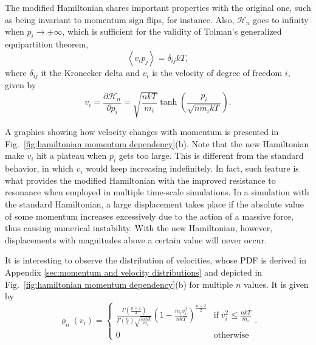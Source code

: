 \documentclass[
aip,
jcp,
reprint,
]{revtex4-1}
\newcommand{\diff}[2]{\frac{\partial #2}{\partial #1}} %
\begin{document}
The modified Hamiltonian shares important properties with the original one, such as being invariant to momentum sign flips, for instance.
Also, $\mathcal{H}_n$ goes to infinity when $p_i \to \pm \infty$, which is sufficient \cite{Uline_2008} for the validity of Tolman's generalized equipartition theorem,
\begin{equation}
\label{eq:generalized equipartition}
\left\langle v_i p_j \right\rangle = \delta_{ij} k T,
\end{equation}
where $\delta_{ij}$ it the Kronecker delta and $v_i$ is the velocity of degree of freedom $i$, given by 
\begin{equation}
\label{eq:velocity definition}
v_i = \diff{p_i}{{\mathcal H}_n} = \sqrt{\frac{n k T}{m_i}} \tanh\left(\frac{p_i}{\sqrt{n m_i k T}}\right).
\end{equation}

A graphics showing how velocity changes with momentum is presented in Fig.~\ref{fig:hamiltonian momentum dependency}(b).
Note that the new Hamiltonian make $v_i$ hit a plateau when $p_i$ gets too large.
This is different from the standard behavior, in which $v_i$ would keep increasing indefinitely.
In fact, such feature is what provides the modified Hamiltonian with the improved resistance to resonance when employed in multiple time-scale simulations.
In a simulation with the standard Hamiltonian, a large displacement takes place if the absolute value of some momentum increases excessively due to the action of a massive force, thus causing numerical instability.
With the new Hamiltonian, however, displacements with magnitudes above a certain value will never occur.

It is interesting to observe the distribution of velocities, whose PDF is derived in Appendix \ref{sec:momentum and velocity distributions} and depicted in Fig.~\ref{fig:hamiltonian momentum dependency}(b) for multiple $n$ values.
It is given by
\begin{equation*}
\label{eq:velocity distribution}
\varrho_n(v_i) =
\begin{cases}
\frac{\Gamma\left(\frac{n+1}{2}\right)}{\Gamma\left(\frac{n}{2}\right) \sqrt{\frac{n \pi k T}{m_i}}} \left(1-\frac{m_i v_i^2}{n k T}\right)^{\frac{n-2}{2}} & \mathrm{if} \; v_i^2 \leq \frac{n k T}{m_i} \\
0 & \mathrm{otherwise}
\end{cases}.
\end{equation*}
\end{document}
